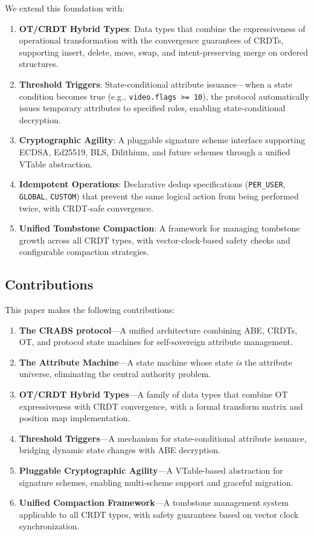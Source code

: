 \documentclass[sigconf,nonacm]{acmart}
\newcommand{\crab}{\textsc{CRABS}}
\begin{document}
We extend this foundation with:

\begin{enumerate}
    \item \textbf{OT/CRDT Hybrid Types}: Data types that combine the expressiveness of operational transformation with the convergence guarantees of CRDTs, supporting insert, delete, move, swap, and intent-preserving merge on ordered structures.
    \item \textbf{Threshold Triggers}: State-conditional attribute issuance---when a state condition becomes true (e.g., \texttt{video.flags >= 10}), the protocol automatically issues temporary attributes to specified roles, enabling state-conditional decryption.
    \item \textbf{Cryptographic Agility}: A pluggable signature scheme interface supporting ECDSA, Ed25519, BLS, Dilithium, and future schemes through a unified VTable abstraction.
    \item \textbf{Idempotent Operations}: Declarative dedup specifications (\texttt{PER\_USER}, \texttt{GLOBAL}, \texttt{CUSTOM}) that prevent the same logical action from being performed twice, with CRDT-safe convergence.
    \item \textbf{Unified Tombstone Compaction}: A framework for managing tombstone growth across all CRDT types, with vector-clock-based safety checks and configurable compaction strategies.
\end{enumerate}

\subsection{Contributions}

This paper makes the following contributions:

\begin{enumerate}
    \item \textbf{The \crab{} protocol}---A unified architecture combining ABE, CRDTs, OT, and protocol state machines for self-sovereign attribute management.
    \item \textbf{The Attribute Machine}---A state machine whose state \textit{is} the attribute universe, eliminating the central authority problem.
    \item \textbf{OT/CRDT Hybrid Types}---A family of data types that combine OT expressiveness with CRDT convergence, with a formal transform matrix and position map implementation.
    \item \textbf{Threshold Triggers}---A mechanism for state-conditional attribute issuance, bridging dynamic state changes with ABE decryption.
    \item \textbf{Pluggable Cryptographic Agility}---A VTable-based abstraction for signature schemes, enabling multi-scheme support and graceful migration.
    \item \textbf{Unified Compaction Framework}---A tombstone management system applicable to all CRDT types, with safety guarantees based on vector clock synchronization.
\end{enumerate}
\end{document}
